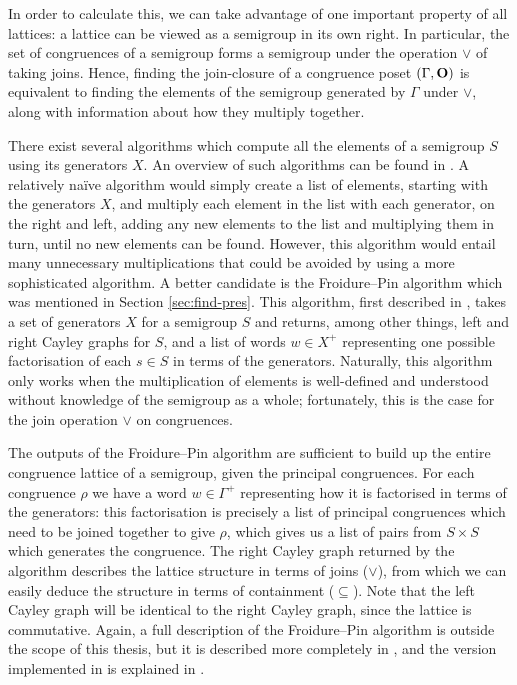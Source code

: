 In order to calculate this, we can take advantage of one important property of
all lattices: a lattice can be viewed as a semigroup in its own right.  In
particular, the set of congruences of a semigroup forms a semigroup under the
operation $\vee$ of taking joins.  Hence, finding the join-closure of a
congruence poset $(\Gamma, \mathbf{O})$ is equivalent to finding the elements of the
semigroup generated by $\Gamma$ under $\vee$, along with information about how
they multiply together.

There exist several algorithms which compute all the elements of a semigroup $S$
using its generators $X$.  An overview of such algorithms can be found in
\cite[\S1]{computing_finite_semigroups}.  A relatively na\"ive algorithm would
simply create a list of elements, starting with the generators $X$, and multiply
each element in the list with each generator, on the right and left, adding any
new elements to the list and multiplying them in turn, until no new elements can
be found.  However, this algorithm would entail many unnecessary multiplications
that could be avoided by using a more sophisticated algorithm.  A better
candidate is the Froidure--Pin algorithm which was mentioned in Section
\ref{sec:find-pres}.  This algorithm, first described in \cite{froidure_pin},
takes a set of generators $X$ for a semigroup $S$ and returns, among other
things, left and right Cayley graphs for $S$, and a list of words $w \in X^+$
representing one possible factorisation of each $s \in S$ in terms of the
generators.  Naturally, this algorithm only works when the multiplication of
elements is well-defined and understood without knowledge of the semigroup as a
whole; fortunately, this is the case for the join operation $\vee$ on
congruences.

The outputs of the Froidure--Pin algorithm are sufficient to build up the entire
congruence lattice of a semigroup, given the principal congruences.  For each
congruence $\rho$ we have a word $w \in \Gamma^+$ representing how it is
factorised in terms of the generators: this factorisation is precisely a list of
principal congruences which need to be joined together to give $\rho$, which
gives us a list of pairs from $S \times S$ which generates the congruence.  The
right Cayley graph returned by the algorithm describes the lattice structure in
terms of joins ($\vee$), from which we can easily deduce the structure in terms
of containment ($\subseteq$).  Note that the left Cayley graph will be identical
to the right Cayley graph, since the lattice is commutative.  Again, a full
description of the Froidure--Pin algorithm is outside the scope of this thesis,
but it is described more completely in \cite{froidure_pin}, and the version
implemented in \libsemigroups{} is explained in
\cite{froidure_pin_jonusas}.


